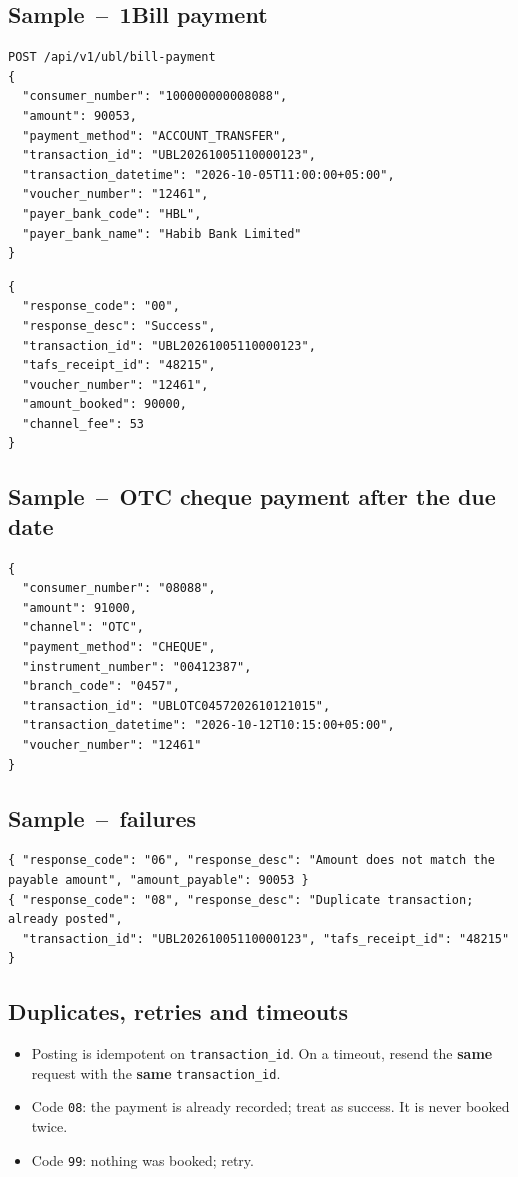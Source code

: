 \documentclass[11pt]{article}
\begin{document}
\subsection{Sample \,--\, 1Bill payment}
\begin{lstlisting}
POST /api/v1/ubl/bill-payment
{
  "consumer_number": "100000000008088",
  "amount": 90053,
  "payment_method": "ACCOUNT_TRANSFER",
  "transaction_id": "UBL20261005110000123",
  "transaction_datetime": "2026-10-05T11:00:00+05:00",
  "voucher_number": "12461",
  "payer_bank_code": "HBL",
  "payer_bank_name": "Habib Bank Limited"
}
\end{lstlisting}
\begin{lstlisting}
{
  "response_code": "00",
  "response_desc": "Success",
  "transaction_id": "UBL20261005110000123",
  "tafs_receipt_id": "48215",
  "voucher_number": "12461",
  "amount_booked": 90000,
  "channel_fee": 53
}
\end{lstlisting}

\subsection{Sample \,--\, OTC cheque payment after the due date}
\begin{lstlisting}
{
  "consumer_number": "08088",
  "amount": 91000,
  "channel": "OTC",
  "payment_method": "CHEQUE",
  "instrument_number": "00412387",
  "branch_code": "0457",
  "transaction_id": "UBLOTC0457202610121015",
  "transaction_datetime": "2026-10-12T10:15:00+05:00",
  "voucher_number": "12461"
}
\end{lstlisting}

\subsection{Sample \,--\, failures}
\begin{lstlisting}
{ "response_code": "06", "response_desc": "Amount does not match the payable amount", "amount_payable": 90053 }
{ "response_code": "08", "response_desc": "Duplicate transaction; already posted",
  "transaction_id": "UBL20261005110000123", "tafs_receipt_id": "48215" }
\end{lstlisting}

\subsection{Duplicates, retries and timeouts}
\begin{itemize}[nosep]
  \item Posting is idempotent on \texttt{transaction\_id}. On a timeout, resend the \textbf{same} request with the
        \textbf{same} \texttt{transaction\_id}.
  \item Code \texttt{08}: the payment is already recorded; treat as success. It is never booked twice.
  \item Code \texttt{99}: nothing was booked; retry.
\end{itemize}
\end{document}
